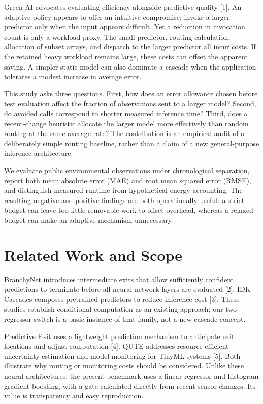 \documentclass[conference,a4paper]{IEEEtran}
\begin{document}
Green AI advocates evaluating efficiency alongside predictive quality [1]. An adaptive policy appears to offer an intuitive compromise: invoke a larger predictor only when the input appears difficult. Yet a reduction in invocation count is only a workload proxy. The small predictor, routing calculation, allocation of subset arrays, and dispatch to the larger predictor all incur costs. If the retained heavy workload remains large, these costs can offset the apparent saving. A simpler static model can also dominate a cascade when the application tolerates a modest increase in average error.

This study asks three questions. First, how does an error allowance chosen before test evaluation affect the fraction of observations sent to a larger model? Second, do avoided calls correspond to shorter measured inference time? Third, does a recent-change heuristic allocate the larger model more effectively than random routing at the same average rate? The contribution is an empirical audit of a deliberately simple routing baseline, rather than a claim of a new general-purpose inference architecture.

We evaluate public environmental observations under chronological separation, report both mean absolute error (MAE) and root mean squared error (RMSE), and distinguish measured runtime from hypothetical energy accounting. The resulting negative and positive findings are both operationally useful: a strict budget can leave too little removable work to offset overhead, whereas a relaxed budget can make an adaptive mechanism unnecessary.

\section{Related Work and Scope}
BranchyNet introduces intermediate exits that allow sufficiently confident predictions to terminate before all neural-network layers are evaluated [2]. IDK Cascades composes pretrained predictors to reduce inference cost [3]. These studies establish conditional computation as an existing approach; our two-regressor switch is a basic instance of that family, not a new cascade concept.

Predictive Exit uses a lightweight prediction mechanism to anticipate exit locations and adjust computation [4]. QUTE addresses resource-efficient uncertainty estimation and model monitoring for TinyML systems [5]. Both illustrate why routing or monitoring costs should be considered. Unlike these neural architectures, the present benchmark uses a linear regressor and histogram gradient boosting, with a gate calculated directly from recent sensor changes. Its value is transparency and easy reproduction.
\end{document}
